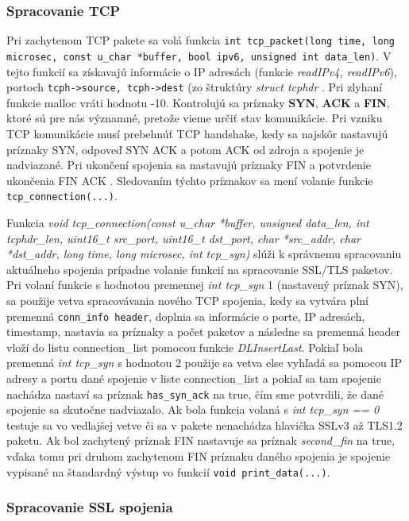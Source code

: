 \documentclass[11pt, a4paper]{article}
\begin{document}
	\subsubsection{Spracovanie TCP}
	Pri zachytenom TCP pakete sa volá funkcia \texttt{int tcp\_packet(long time, long microsec, const u\_char *buffer, bool ipv6, unsigned int data\_len)}. V tejto funkcií sa získavajú informácie o IP adresách (funkcie \emph{readIPv4, readIPv6}), portoch \texttt{tcph->source, tcph->dest} (zo štruktúry \emph{struct tcphdr} \cite{prednaskaIPv4} \cite{prednaskaIPv6}. Pri zlyhaní funkcie malloc vráti hodnotu -10. Kontrolujú sa príznaky \textbf{SYN}, \textbf{ACK} a  \textbf{FIN}, ktoré sú pre nás významné, pretože vieme určiť stav komunikácie. Pri vzniku TCP komunikácie musí prebehnúť TCP handshake, kedy sa najskôr nastavujú príznaky SYN, odpoveď SYN ACK a potom ACK od zdroja a spojenie je nadviazané. Pri ukončení spojenia sa nastavujú príznaky FIN a potvrdenie ukončenia FIN ACK \cite{prednaskaTransport}. Sledovaním týchto príznakov sa mení volanie funkcie \texttt{tcp\_connection(...)}. 
	
	Funkcia \emph{void tcp\_connection(const u\_char *buffer, unsigned data\_len, int tcphdr\_len, uint16\_t src\_port, uint16\_t dst\_port, char *src\_addr, char *dst\_addr, long time, long microsec, int tcp\_syn)} slúži k správnemu spracovaniu aktuálneho spojenia prípadne volanie funkcií na spracovanie SSL/TLS paketov. Pri volaní funkcie s hodnotou premennej \emph{int tcp\_syn} 1 (nastavený príznak SYN), sa použije vetva spracovávania nového TCP spojenia, kedy sa vytvára plní premenná \texttt{conn\_info header}, doplnia sa informácie o porte, IP adresách, timestamp, nastavia sa príznaky a počet paketov a následne sa premenná header vloží do listu connection\_list pomocou funkcie \emph{DLInsertLast}. Pokiaľ bola premenná \emph{int tcp\_syn} s hodnotou 2 použije sa vetva else vyhľadá sa pomocou IP adresy a portu dané spojenie v liste connection\_list a pokiaľ sa tam spojenie nachádza nastaví sa príznak \texttt{has\_syn\_ack} na true, čím sme potvrdili, že dané spojenie sa skutočne nadviazalo. Ak bola funkcia volaná s \emph{int tcp\_syn == 0} testuje sa vo vedlajšej vetve či sa v pakete nenachádza hlavička SSLv3 až TLS1.2 paketu. Ak bol zachytený príznak FIN nastavuje sa príznak \emph{second\_fin} na true, vďaka tomu pri druhom zachytenom FIN príznaku daného spojenia je spojenie vypisané na štandardný výstup vo funkcií \texttt{void print\_data(...)}. 
	
	\subsubsection{Spracovanie SSL spojenia}
	
\end{document}
